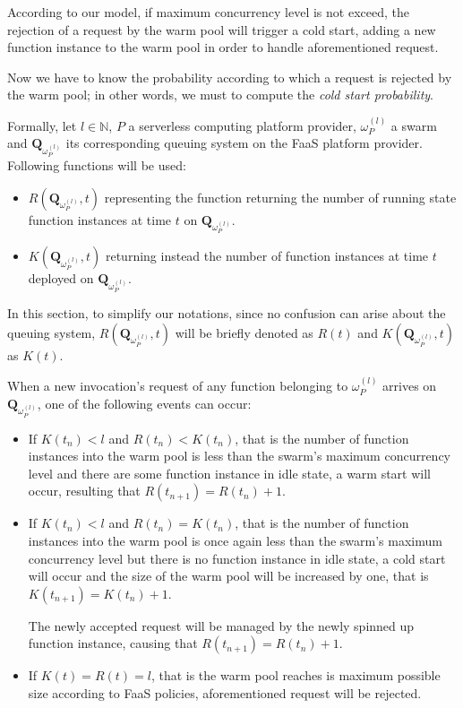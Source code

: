 \documentclass[12pt,a4paper]{report}
\newcommand{\N}{\mathbb{N}}
\begin{document}
According to our model, if maximum concurrency level is not exceed, the rejection of a request by the warm pool will trigger a cold start, adding a new function instance to the warm pool in order to handle aforementioned request. 

Now we have to know the probability according to which a request is rejected by the warm pool; in other words, we must to compute the \textit{cold start probability}. 

Formally, let $l \in \N$, $P$ a serverless computing platform provider, $\omega_{P}^{(l)}$ a swarm and $\textbf{Q}_{\omega_{P}^{(l)}}$ its corresponding queuing system on the FaaS platform provider. Following functions will be used:

\begin{itemize}
	\item $R(\textbf{Q}_{\omega_{P}^{(l)}}, t)$ representing the function returning the number of running state function instances at time $t$ on $\textbf{Q}_{\omega_{P}^{(l)}}$.
	
	\item $K(\textbf{Q}_{\omega_{P}^{(l)}}, t)$ returning instead the number of function instances at time $t$ deployed on $\textbf{Q}_{\omega_{P}^{(l)}}$.
\end{itemize}

In this section, to simplify our notations, since no confusion can arise about the queuing system, $R(\textbf{Q}_{\omega_{P}^{(l)}}, t)$ will be briefly denoted as $R(t)$ and $K(\textbf{Q}_{\omega_{P}^{(l)}}, t)$ as $K(t)$.

When a new invocation's request of any function belonging to $\omega_{P}^{(l)}$ arrives on $\textbf{Q}_{\omega_{P}^{(l)}}$, one of the following events can occur:

\begin{itemize}
	\item If $K(t_n) < l$ and $R(t_n) < K(t_n)$, that is the number of function instances into the warm pool is less than the swarm's maximum concurrency level and there are some function instance in idle state, a warm start will occur, resulting that $R(t_{n+1}) = R(t_n) + 1$.
	
	
	\item If $K(t_n) < l$ and $R(t_n) = K(t_n)$, that is the number of function instances into the warm pool is once again less than the swarm's maximum concurrency level but there is no function instance in idle state, a cold start will occur and the size of the warm pool will be increased by one, that is $K(t_{n+1}) = K(t_n) + 1$.
	
	The newly accepted request will be managed by the newly spinned up function instance, causing that $R(t_{n+1}) = R(t_n) + 1$.
	
	\item If $K(t) = R(t) = l$, that is the warm pool reaches is maximum possible size according to FaaS policies, aforementioned request will be rejected.
\end{itemize}
\end{document}
